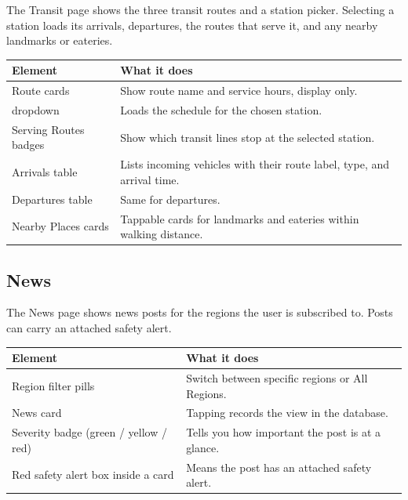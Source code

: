 \documentclass[11pt,letterpaper]{article}
\let\oldtexttt\texttt
\renewcommand{\texttt}[1]{{\color{inlinecode}\oldtexttt{#1}}}
\begin{document}
The Transit page shows the three transit routes and a station picker. Selecting a station loads its arrivals, departures, the routes that serve it, and any nearby landmarks or eateries.

\begin{table}[H]
    \centering
    \begin{tabularx}{\textwidth}{lX}
        \toprule
        \textbf{Element} & \textbf{What it does} \\
        \midrule
        Route cards & Show route name and service hours, display only. \\
        \texttt{Select a station} dropdown & Loads the schedule for the chosen station. \\
        Serving Routes badges & Show which transit lines stop at the selected station. \\
        Arrivals table & Lists incoming vehicles with their route label, type, and arrival time. \\
        Departures table & Same for departures. \\
        Nearby Places cards & Tappable cards for landmarks and eateries within walking distance. \\
        \bottomrule
    \end{tabularx}
\end{table}

\subsection{News}

The News page shows news posts for the regions the user is subscribed to. Posts can carry an attached safety alert.

\begin{table}[H]
    \centering
    \begin{tabularx}{\textwidth}{lX}
        \toprule
        \textbf{Element} & \textbf{What it does} \\
        \midrule
        Region filter pills & Switch between specific regions or All Regions. \\
        News card & Tapping records the view in the database. \\
        Severity badge (green / yellow / red) & Tells you how important the post is at a glance. \\
        Red safety alert box inside a card & Means the post has an attached safety alert. \\
        \bottomrule
    \end{tabularx}
\end{table}
\end{document}
